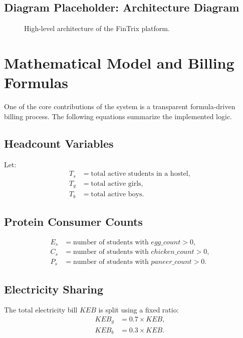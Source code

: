 \documentclass[conference]{IEEEtran}
\begin{document}
\subsection{Diagram Placeholder: Architecture Diagram}
\begin{figure}[H]
\centering
{}
\caption{High-level architecture of the FinTrix platform.}
\label{fig:architecture}
\end{figure}

\section{Mathematical Model and Billing Formulas}
One of the core contributions of the system is a transparent formula-driven billing process. The following equations summarize the implemented logic.

\subsection{Headcount Variables}
Let:
\begin{align}
T_s &= \text{total active students in a hostel}, \\
T_g &= \text{total active girls}, \\
T_b &= \text{total active boys}.
\end{align}

\subsection{Protein Consumer Counts}
\begin{align}
E_s &= \text{number of students with } egg\_count > 0, \\
C_s &= \text{number of students with } chicken\_count > 0, \\
P_s &= \text{number of students with } paneer\_count > 0.
\end{align}

\subsection{Electricity Sharing}
The total electricity bill \(KEB\) is split using a fixed ratio:
\begin{align}
KEB_g &= 0.7 \times KEB, \\
KEB_b &= 0.3 \times KEB.
\end{align}
\end{document}
